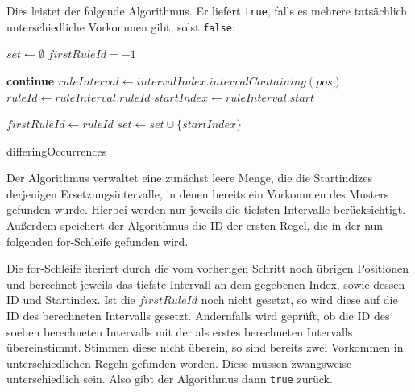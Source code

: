 Dies leistet der folgende Algorithmus. Er liefert \texttt{true}, falls es mehrere tatsächlich unterschiedliche Vorkommen gibt, solst \texttt{false}:

\begin{algorithm}
    $set \leftarrow \emptyset$\;
    $firstRuleId = -1$\;
     {
         { 
            \textbf{continue}\;
        }
        $ruleInterval \leftarrow intervalIndex.intervalContaining(pos)$\;
        $ruleId \leftarrow ruleInterval.ruleId$\;
        $startIndex \leftarrow ruleInterval.start$\;

         {
            $firstRuleId \leftarrow ruleId$\;
        }
         {
        }
        $set \leftarrow set \cup \{startIndex\}$\;
    }
    
    \caption{differingOccurrences}
\end{algorithm}

Der Algorithmus verwaltet eine zunächst leere Menge, die die Startindizes derjenigen Ersetzungsintervalle, in denen bereits ein Vorkommen des Musters gefunden wurde. Hierbei werden nur jeweils die tiefsten Intervalle berücksichtigt. Außerdem speichert der Algorithmus die ID der ersten Regel, die in der nun folgenden for-Schleife gefunden wird.

Die for-Schleife iteriert durch die vom vorherigen Schritt noch übrigen Positionen und berechnet jeweils das tiefste Intervall an dem gegebenen Index, sowie dessen ID und Startindex. Ist die $firstRuleId$ noch nicht gesetzt, so wird diese auf die ID des berechneten Intervalls gesetzt. Andernfalls wird geprüft, ob die ID des soeben berechneten Intervalls mit der als erstes berechneten Intervalls übereinstimmt. Stimmen diese nicht überein, so sind bereits zwei Vorkommen in unterschiedlichen Regeln gefunden worden. Diese müssen zwangsweise unterschiedlich sein. Also gibt der Algorithmus dann \texttt{true} zurück.

